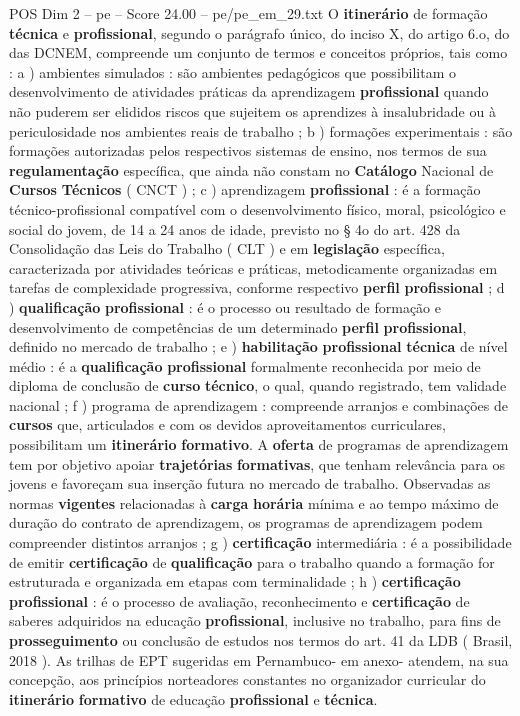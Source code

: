 \begin{textsample}{POS Dim 2 – pe – Score 24.00 – pe/pe\_em\_29.txt}
O \textbf{itinerário} de formação \textbf{técnica} e \textbf{profissional}, segundo o parágrafo único, do inciso X, do artigo 6.o, do das DCNEM, compreende um conjunto de termos e conceitos próprios, tais como : a ) ambientes simulados : são ambientes pedagógicos que possibilitam o desenvolvimento de atividades práticas da aprendizagem \textbf{profissional} quando não puderem ser elididos riscos que sujeitem os aprendizes à insalubridade ou à periculosidade nos ambientes reais de trabalho ; b ) formações experimentais : são formações autorizadas pelos respectivos sistemas de ensino, nos termos de sua \textbf{regulamentação} específica, que ainda não constam no \textbf{Catálogo} Nacional de \textbf{Cursos} \textbf{Técnicos} ( CNCT ) ; c ) aprendizagem \textbf{profissional} : é a formação técnico-profissional compatível com o desenvolvimento físico, moral, psicológico e social do jovem, de 14 a 24 anos de idade, previsto no § 4o do art. 428 da Consolidação das Leis do Trabalho ( CLT ) e em \textbf{legislação} específica, caracterizada por atividades teóricas e práticas, metodicamente organizadas em tarefas de complexidade progressiva, conforme respectivo \textbf{perfil} \textbf{profissional} ; d ) \textbf{qualificação} \textbf{profissional} : é o processo ou resultado de formação e desenvolvimento de competências de um determinado \textbf{perfil} \textbf{profissional}, definido no mercado de trabalho ; e ) \textbf{habilitação} \textbf{profissional} \textbf{técnica} de nível médio : é a \textbf{qualificação} \textbf{profissional} formalmente reconhecida por meio de diploma de conclusão de \textbf{curso} \textbf{técnico}, o qual, quando registrado, tem validade nacional ; f ) programa de aprendizagem : compreende arranjos e combinações de \textbf{cursos} que, articulados e com os devidos aproveitamentos curriculares, possibilitam um \textbf{itinerário} \textbf{formativo}.
A \textbf{oferta} de programas de aprendizagem tem por objetivo apoiar \textbf{trajetórias} \textbf{formativas}, que tenham relevância para os jovens e favoreçam sua inserção futura no mercado de trabalho.
Observadas as normas \textbf{vigentes} relacionadas à \textbf{carga} \textbf{horária} mínima e ao tempo máximo de duração do contrato de aprendizagem, os programas de aprendizagem podem compreender distintos arranjos ; g ) \textbf{certificação} intermediária : é a possibilidade de emitir \textbf{certificação} de \textbf{qualificação} para o trabalho quando a formação for estruturada e organizada em etapas com terminalidade ; h ) \textbf{certificação} \textbf{profissional} : é o processo de avaliação, reconhecimento e \textbf{certificação} de saberes adquiridos na educação \textbf{profissional}, inclusive no trabalho, para fins de \textbf{prosseguimento} ou conclusão de estudos nos termos do art. 41 da LDB ( Brasil, 2018 ).
As trilhas de EPT sugeridas em Pernambuco- em anexo- atendem, na sua concepção, aos princípios norteadores constantes no organizador curricular do \textbf{itinerário} \textbf{formativo} de educação \textbf{profissional} e \textbf{técnica}.


\end{textsample}
